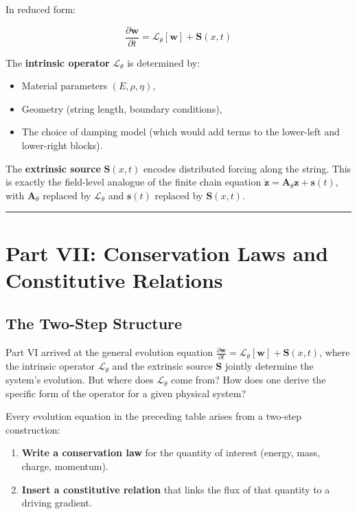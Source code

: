 \documentclass[
  letterpaper,
  DIV=11,
  numbers=noendperiod]{scrartcl}
\providecommand{\tightlist}{%
  \setlength{\itemsep}{0pt}\setlength{\parskip}{0pt}}
\begin{document}
In reduced form:

\[\frac{\partial \mathbf{w}}{\partial t} = \mathcal{L}_\theta[\mathbf{w}] + \mathbf{S}(x,t)\]

The \textbf{intrinsic operator} \(\mathcal{L}_\theta\) is determined by:

\begin{itemize}
\tightlist
\item
  Material parameters \((E, \rho, \eta)\),
\item
  Geometry (string length, boundary conditions),
\item
  The choice of damping model (which would add terms to the lower-left
  and lower-right blocks).
\end{itemize}

The \textbf{extrinsic source} \(\mathbf{S}(x,t)\) encodes distributed
forcing along the string. This is exactly the field-level analogue of
the finite chain equation
\(\dot{\mathbf{z}} = \mathbf{A}_\theta \mathbf{z} + \mathbf{s}(t)\),
with \(\mathbf{A}_\theta\) replaced by \(\mathcal{L}_\theta\) and
\(\mathbf{s}(t)\) replaced by \(\mathbf{S}(x,t)\).

\begin{center}\rule{0.5\linewidth}{0.5pt}\end{center}

\section{Part VII: Conservation Laws and Constitutive
Relations}\label{part-vii-conservation-laws-and-constitutive-relations}

\subsection{The Two-Step Structure}\label{the-two-step-structure}

Part VI arrived at the general evolution equation
\(\frac{\partial \mathbf{w}}{\partial t} = \mathcal{L}_\theta[\mathbf{w}] + \mathbf{S}(x,t)\),
where the intrinsic operator \(\mathcal{L}_\theta\) and the extrinsic
source \(\mathbf{S}\) jointly determine the system's evolution. But
where does \(\mathcal{L}_\theta\) come from? How does one derive the
specific form of the operator for a given physical system?

Every evolution equation in the preceding table arises from a two-step
construction:

\begin{enumerate}
\def\labelenumi{\arabic{enumi}.}
\tightlist
\item
  \textbf{Write a conservation law} for the quantity of interest
  (energy, mass, charge, momentum).
\item
  \textbf{Insert a constitutive relation} that links the flux of that
  quantity to a driving gradient.
\end{enumerate}
\end{document}
